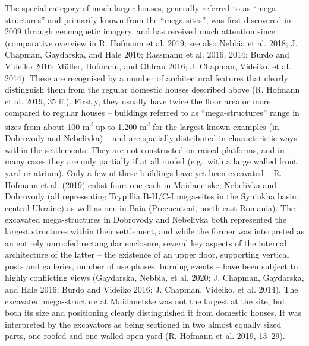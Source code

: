\documentclass[
  12pt,
  a4paper, twoside]{book}
\begin{document}
The special category of much larger houses, generally referred to as ``mega-structures'' and primarily known from the ``mega-sites'', was first discovered in 2009 through geomagnetic imagery, and has received much attention since (comparative overview in R. Hofmann et al. 2019; see also Nebbia et al. 2018; J. Chapman, Gaydarska, and Hale 2016; Rassmann et al. 2016, 2014; Burdo and Videiko 2016; Müller, Hofmann, and Ohlrau 2016; J. Chapman, Videiko, et al. 2014). These are recognised by a number of architectural features that clearly distinguish them from the regular domestic houses described above (R. Hofmann et al. 2019, 35 ff.). Firstly, they usually have twice the floor area or more compared to regular houses -- buildings referred to as ``mega-structures'' range in sizes from about 100 m\textsuperscript{2} up to 1.200 m\textsuperscript{2} for the largest known examples (in Dobrovody and Nebelivka) -- and are spatially distributed in characteristic ways within the settlements. They are not constructed on raised platforms, and in many cases they are only partially if at all roofed (e.g.~with a large walled front yard or atrium). Only a few of these buildings have yet been excavated -- R. Hofmann et al. (2019) enlist four: one each in Maidanetske, Nebelivka and Dobrovody (all representing Trypillia B-II/C-I mega-sites in the Syniukha basin, central Ukraine) as well as one in Baia (Precucuteni, north-east Romania). The excavated mega-structures in Dobrovody and Nebelivka both represented the largest structures within their settlement, and while the former was interpreted as an entirely unroofed rectangular enclosure, several key aspects of the internal architecture of the latter -- the existence of an upper floor, supporting vertical posts and galleries, number of use phases, burning events -- have been subject to highly conflicting views (Gaydarska, Nebbia, et al. 2020; J. Chapman, Gaydarska, and Hale 2016; Burdo and Videiko 2016; J. Chapman, Videiko, et al. 2014). The excavated mega-structure at Maidanetske was not the largest at the site, but both its size and positioning clearly distinguished it from domestic houses. It was interpreted by the excavators as being sectioned in two almost equally sized parts, one roofed and one walled open yard (R. Hofmann et al. 2019, 13--29).
\end{document}
